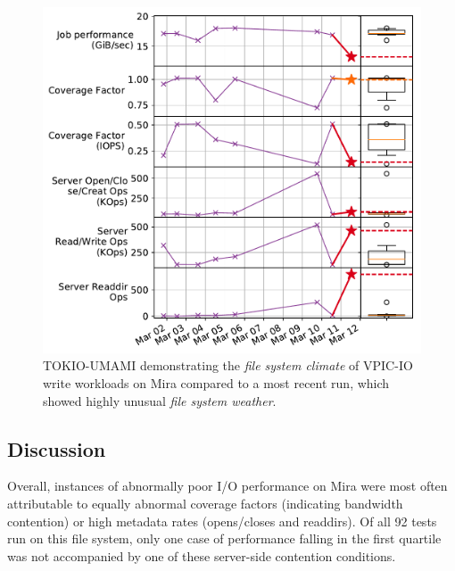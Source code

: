 \begin{figure}[t]
    \centering
    \includegraphics[width=1.0\columnwidth]{figs/umami-mira-fs1-vpic-write.pdf}
    \caption{TOKIO-UMAMI demonstrating the \emph{file system climate} of VPIC-IO write workloads
    on Mira compared to a most recent run, which showed
    highly unusual \emph{file system weather}.}
    \label{fig:umami-mira-fs1-vpic-write}
\end{figure}

\subsection{Discussion} \label{sec:results/discussion}

Overall, instances of abnormally poor I/O performance on Mira were most often attributable to equally abnormal coverage factors (indicating bandwidth contention) or high metadata rates (opens/closes and readdirs).
Of all 92 tests run on this file system, only one case of performance falling in the first quartile was not accompanied by one of these server-side contention conditions.

